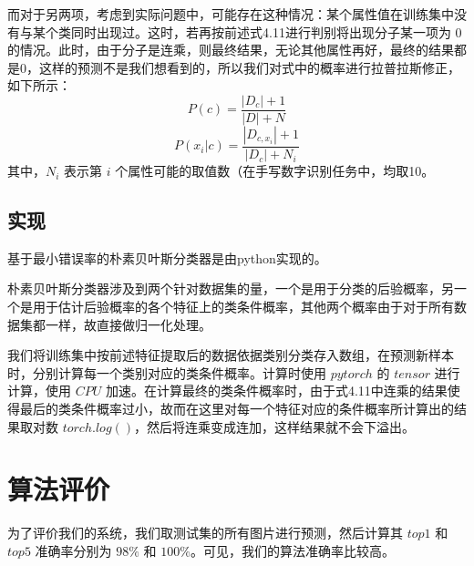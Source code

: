 \documentclass[UTF8, a4paper, 12pt]{report}
\begin{document}
			而对于另两项，考虑到实际问题中，可能存在这种情况：某个属性值在训练集中没有与某个类同时出现过。这时，若再按前述式4.11进行判别将出现分子某一项为 $0$ 的情况。此时，由于分子是连乘，则最终结果，无论其他属性再好，最终的结果都是0，这样的预测不是我们想看到的，所以我们对式中的概率进行拉普拉斯修正，如下所示：
			\begin{equation}
				P(c) = \frac{|D_c|+1}{|D|+N}
			\end{equation}
			\begin{equation}
				P(x_i|c) = \frac{|D_{c, x_i}|+1}{|D_c|+N_i}
			\end{equation}
其中，$N_i$ 表示第 $i$ 个属性可能的取值数（在手写数字识别任务中，均取10。

		\subsection{实现}
			基于最小错误率的朴素贝叶斯分类器是由python实现的。

			朴素贝叶斯分类器涉及到两个针对数据集的量，一个是用于分类的后验概率，另一个是用于估计后验概率的各个特征上的类条件概率，其他两个概率由于对于所有数据集都一样，故直接做归一化处理。

			我们将训练集中按前述特征提取后的数据依据类别分类存入数组，在预测新样本时，分别计算每一个类别对应的类条件概率。计算时使用 $pytorch$ 的 $tensor$ 进行计算，使用 $CPU$ 加速。在计算最终的类条件概率时，由于式4.11中连乘的结果使得最后的类条件概率过小，故而在这里对每一个特征对应的条件概率所计算出的结果取对数 $torch.log()$，然后将连乘变成连加，这样结果就不会下溢出。

	\section{算法评价}
		为了评价我们的系统，我们取测试集的所有图片进行预测，然后计算其 $top1$ 和 $top5$ 准确率分别为 $98\%$ 和 $100\%$。可见，我们的算法准确率比较高。
\clearpage
\end{document}
